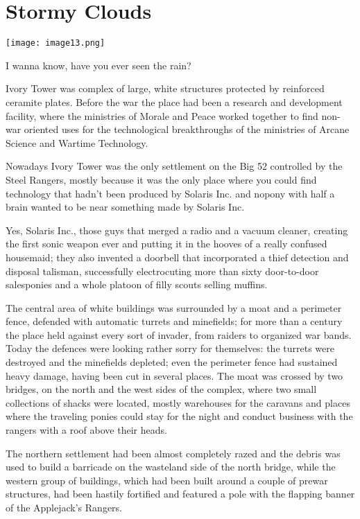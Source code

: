 \chapter{Stormy Clouds}

\texttt{[image: image13.png]}

\begin{intro}
I wanna know, have you ever seen the rain?    
\end{intro}


Ivory Tower was complex of large, white structures protected by reinforced ceramite plates. Before the war the place had been a research and development facility, where the ministries of Morale and Peace worked together to find non-war oriented uses for the technological breakthroughs of the ministries of Arcane Science and Wartime Technology.

Nowadays Ivory Tower was the only settlement on the Big 52 controlled by the Steel Rangers, mostly because it was the only place where you could find technology that hadn't been produced by Solaris Inc. and nopony with half a brain wanted to be near something made by Solaris Inc.

Yes, Solaris Inc., those guys that merged a radio and a vacuum cleaner, creating the first sonic weapon ever and putting it in the hooves of a really confused housemaid; they also invented a doorbell that incorporated a thief detection and disposal talisman, successfully electrocuting more than sixty door-to-door salesponies and a whole platoon of filly scouts selling muffins.

The central area of white buildings was surrounded by a moat and a perimeter fence, defended with automatic turrets and minefields; for more than a century the place held against every sort of invader, from raiders to organized war bands. Today the defences were looking rather sorry for themselves: the turrets were destroyed and the minefields depleted; even the perimeter fence had sustained heavy damage, having been cut in several places. The moat was crossed by two bridges, on the north and the west sides of the complex, where two small collections of shacks were located, mostly warehouses for the caravans and places where the traveling ponies could stay for the night and conduct business with the rangers with a roof above their heads.

The northern settlement had been almost completely razed and the debris was used to build a barricade on the wasteland side of the north bridge, while the western group of buildings, which had been built around a couple of prewar structures, had been hastily fortified and featured a pole with the flapping banner of the Applejack's Rangers.


